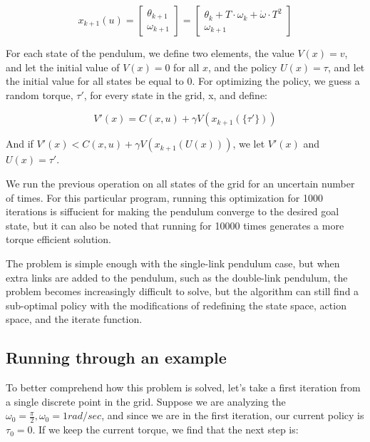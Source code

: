 \documentclass[12pt]{report}
\begin{document}
\begin{equation} 
x_{k+1}(u) = 
\begin{bmatrix}
\theta_{k+1} \\
\omega_{k+1}
\end{bmatrix}
=
\begin{bmatrix}
\theta_{k} + T \cdot \omega_{k} + \dot{\omega} \cdot T^2 \\
\omega_{k+1}
\end{bmatrix}
\end{equation}

For each state of the pendulum, we define two elements, the value $V(x) = {v}$, and let the initial value of $V(x)=0$ for all $x$, and the policy $U(x)={\tau}$, and let the initial value for all states be equal to 0. For optimizing the policy, we guess a random torque, $\tau'$, for every state in the grid, x, and define:

\begin{equation} 
V'(x) = C(x,u) + \gamma V(x_{k+1}(\{\tau '\}))
\end{equation}

And if $V'(x)<C(x,u) + \gamma V(x_{k+1}(U(x)))$, we let $V'(x)$ and $U(x)={\tau'}$.

We run the previous operation on all states of the grid for an uncertain number of times. For this particular program, running this optimization for 1000 iterations is siffucient for making the pendulum converge to the desired goal state, but it can also be noted that running for 10000 times generates a more torque efficient solution.

The problem is simple enough with the single-link pendulum case, but when extra links are added to the pendulum, such as the double-link pendulum, the problem becomes increasingly difficult to solve, but the algorithm can still find a sub-optimal policy with the modifications of redefining the state space, action space, and the iterate function.

\subsection{Running through an example}

To better comprehend how this problem is solved, let’s take a first iteration from a single discrete point in the grid. Suppose we are analyzing the $\omega_0=\frac{\pi}{2}, \omega_0=1 rad/sec$, and since we are in the first iteration, our current policy is $\tau_0=0$. If we keep the current torque, we find that the next step is:
	
\end{document}
